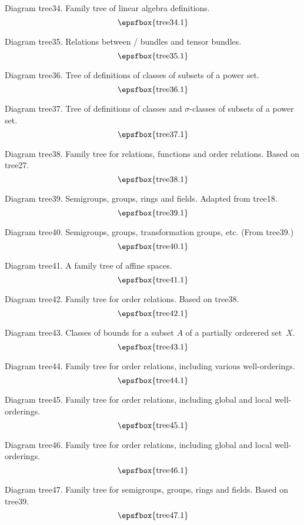 Diagram tree34. Family tree of linear algebra definitions.
$$
\centerline{\epsfbox{tree34.1}}
$$

\filleject

Diagram tree35. Relations between \fibre/ bundles and tensor bundles.
$$
\centerline{\epsfbox{tree35.1}}
$$

Diagram tree36. Tree of definitions of classes of subsets of a power set.
$$
\centerline{\epsfbox{tree36.1}}
$$

Diagram tree37. Tree of definitions of classes and $\sigma$-classes of subsets
of a power set.
$$
\centerline{\epsfbox{tree37.1}}
$$

Diagram tree38. Family tree for relations, functions and order relations. Based
on tree27.
$$
\centerline{\epsfbox{tree38.1}}
$$

\filleject

Diagram tree39. Semigroups, groups, rings and fields. Adapted from tree18.
$$
\centerline{\epsfbox{tree39.1}}
$$

Diagram tree40. Semigroups, groups, transformation groups, etc. (From tree39.)
$$
\centerline{\epsfbox{tree40.1}}
$$

Diagram tree41. A family tree of affine spaces.
$$
\centerline{\epsfbox{tree41.1}}
$$

\filleject

Diagram tree42. Family tree for order relations. Based on tree38.
$$
\centerline{\epsfbox{tree42.1}}
$$

Diagram tree43. Classes of bounds for a subset $A$ of a partially orderered
set~$X$.
$$
\centerline{\epsfbox{tree43.1}}
$$

Diagram tree44. Family tree for order relations, including various
well-orderings.
$$
\centerline{\epsfbox{tree44.1}}
$$

Diagram tree45. Family tree for order relations, including global and local
well-orderings.
$$
\centerline{\epsfbox{tree45.1}}
$$

\filleject

Diagram tree46. Family tree for order relations, including global and local
well-orderings.
$$
\centerline{\epsfbox{tree46.1}}
$$

Diagram tree47. Family tree for semigroups, groups, rings and fields. Based on
tree39.
$$
\centerline{\epsfbox{tree47.1}}
$$

